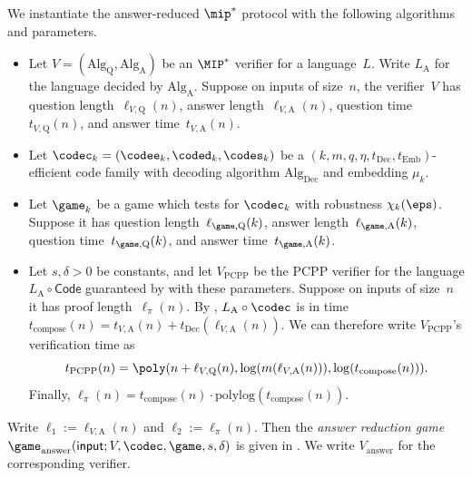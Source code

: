 \begin{definition}\label{def:answer-reduction-game}
We instantiate the answer-reduced $\mip^*$ protocol with the following algorithms and parameters.
\begin{itemize}
\item[$\circ$] Let $V = (\mathrm{Alg}_{\mathrm{Q}}, \mathrm{Alg}_{\mathrm{A}})$ be an $\MIP^*$ verifier for a language~$L$.
		Write $L_{\mathrm{A}}$ for the language decided by $\mathrm{Alg}_{\mathrm{A}}$.
		Suppose on inputs of size~$n$, the verifier~$V$ has question length~$\ell_{V,\mathrm{Q}}(n)$, answer length~$\ell_{V,\mathrm{A}}(n)$,
		question time~$t_{V,\mathrm{Q}}(n)$, and answer time~$t_{V,\mathrm{A}}(n)$.
\item[$\circ$] Let $\codec_k = (\codee_k,\coded_k, \codes_k)$ be a $(k, m, q, \eta, t_{\mathrm{Dec}}, t_{\mathrm{Emb}})$-efficient code family
		with decoding algorithm $\mathrm{Alg}_{\mathrm{Dec}}$ and embedding $\mu_k$.
\item[$\circ$] Let $\game_k$ be a game which tests for $\codec_k$ with robustness $\chi_k(\eps)$.
		Suppose it has question length~$\ell_{\game, \mathrm{Q}}(k)$, answer length~$\ell_{\game,\mathrm{A}}(k)$,
		question time~$t_{\game,\mathrm{Q}}(k)$, and answer time~$t_{\game,\mathrm{A}}(k)$.
\item[$\circ$] Let $s, \delta > 0$ be constants, and let $V_{\mathrm{PCPP}}$ be the PCPP verifier for the language $L_{\mathrm{A}} \circ \mathsf{Code}$
			guaranteed by  with these parameters.
			Suppose on inputs of size~$n$ it has proof length~$\ell_\pi(n)$.
			By , $L_{\mathrm{A}} \circ \codec$ is in time
			$t_{\mathrm{compose}}(n) = t_{V, \mathrm{A}}(n) + t_{\mathrm{Dec}}(\ell_{V,\mathrm{A}}(n))$.
			We can therefore write $V_{\mathrm{PCPP}}$'s verification time as
			\begin{equation*}
				t_{\mathrm{PCPP}}(n) = \poly(n + \ell_{V, \mathrm{Q}}(n), \log(m(\ell_{V, \mathrm{A}}(n))), \log(t_{\mathrm{compose}}(n))).
			\end{equation*}
			Finally, $\ell_\pi(n) = t_{\mathrm{compose}}(n) \cdot \mathrm{poly log}(t_{\mathrm{compose}}(n))$.
\end{itemize}
Write $\ell_1 := \ell_{V, \mathrm{A}}(n)$ and $\ell_2 := \ell_\pi(n)$.
Then the \emph{answer reduction game} $\game_{\mathrm{answer}}(\mathsf{input};V, \codec, \game, s, \delta)$
is given in .
We write $V_{\mathrm{answer}}$ for the corresponding verifier.
\end{definition}

